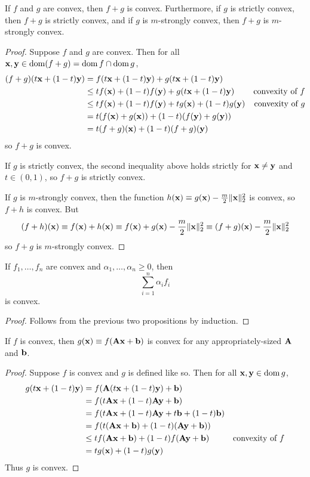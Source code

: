 \begin{proposition}
If $f$ and $g$ are convex, then $f+g$ is convex.
Furthermore, if $g$ is strictly convex, then $f+g$ is strictly convex, and if $g$ is $m$-strongly convex, then $f+g$ is $m$-strongly convex.
\end{proposition}
\begin{proof}
Suppose $f$ and $g$ are convex. Then for all $\mathbf{x}, \mathbf{y} \in \operatorname*{dom} (f+g) = \operatorname*{dom} f \cap \operatorname*{dom} g$,
\begin{align*}
(f+g)(t\mathbf{x} + (1-t)\mathbf{y}) &= f(t\mathbf{x} + (1-t)\mathbf{y}) + g(t\mathbf{x} + (1-t)\mathbf{y}) \\
&\leq tf(\mathbf{x}) + (1-t)f(\mathbf{y}) + g(t\mathbf{x} + (1-t)\mathbf{y}) & \text{convexity of $f$} \\
&\leq tf(\mathbf{x}) + (1-t)f(\mathbf{y}) + tg(\mathbf{x}) + (1-t)g(\mathbf{y}) & \text{convexity of $g$} \\
&= t(f(\mathbf{x}) + g(\mathbf{x})) + (1-t)(f(\mathbf{y}) + g(\mathbf{y})) \\
&= t(f+g)(\mathbf{x}) + (1-t)(f+g)(\mathbf{y})
\end{align*}
so $f + g$ is convex.

If $g$ is strictly convex, the second inequality above holds strictly for $\mathbf{x} \neq \mathbf{y}$ and $t \in (0,1)$, so $f+g$ is strictly convex.

If $g$ is $m$-strongly convex, then the function $h(\mathbf{x}) \equiv g(\mathbf{x}) - \frac{m}{2}\|\mathbf{x}\|_2^2$ is convex, so $f+h$ is convex.
But
\[(f+h)(\mathbf{x}) \equiv f(\mathbf{x}) + h(\mathbf{x}) \equiv f(\mathbf{x}) + g(\mathbf{x}) - \frac{m}{2}\|\mathbf{x}\|_2^2 \equiv (f+g)(\mathbf{x}) - \frac{m}{2}\|\mathbf{x}\|_2^2\]
so $f+g$ is $m$-strongly convex.
\end{proof}

\begin{proposition}
If $f_1, \dots, f_n$ are convex and $\alpha_1, \dots, \alpha_n \geq 0$, then
\[\sum_{i=1}^n \alpha_i f_i\]
is convex.
\end{proposition}
\begin{proof}
Follows from the previous two propositions by induction.
\end{proof}

\begin{proposition}
If $f$ is convex, then $g(\mathbf{x}) \equiv f(\mathbf{A}\mathbf{x} + \mathbf{b})$ is convex for any appropriately-sized $\mathbf{A}$ and $\mathbf{b}$.
\end{proposition}
\begin{proof}
Suppose $f$ is convex and $g$ is defined like so. Then for all $\mathbf{x}, \mathbf{y} \in \operatorname*{dom} g$,
\begin{align*}
g(t\mathbf{x} + (1-t)\mathbf{y}) &= f(\mathbf{A}(t\mathbf{x} + (1-t)\mathbf{y}) + \mathbf{b}) \\
&= f(t\mathbf{A}\mathbf{x} + (1-t)\mathbf{A}\mathbf{y} + \mathbf{b}) \\
&= f(t\mathbf{A}\mathbf{x} + (1-t)\mathbf{A}\mathbf{y} + t\mathbf{b} + (1-t)\mathbf{b}) \\
&= f(t(\mathbf{A}\mathbf{x} + \mathbf{b}) + (1-t)(\mathbf{A}\mathbf{y} + \mathbf{b})) \\
&\leq tf(\mathbf{A}\mathbf{x} + \mathbf{b}) + (1-t)f(\mathbf{A}\mathbf{y} + \mathbf{b}) & \text{convexity of $f$} \\
&= tg(\mathbf{x}) + (1-t)g(\mathbf{y})
\end{align*}
Thus $g$ is convex.
\end{proof}

